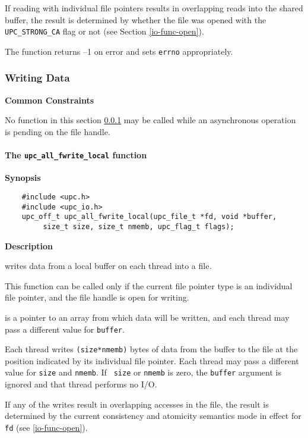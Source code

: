\np If reading with individual file pointers results in overlapping reads into the
shared buffer, the result is determined by whether the file was opened with
the {\tt UPC\_STRONG\_CA} flag or not (see Section \ref{io-func-open}).

\np The function returns --1 on error and sets {\tt errno} appropriately.

\subsubsection{Writing Data}
\label{io-func-write}
{\bf Common Constraints}

\npf No function in this section \ref{io-func-write} may be called while an asynchronous
operation is pending on the file handle.

\paragraph{The {\tt upc\_all\_fwrite\_local} function}

{\bf Synopsis}

\npf\vspace{-2.5em}
\begin{verbatim}
    #include <upc.h>
    #include <upc_io.h>
    upc_off_t upc_all_fwrite_local(upc_file_t *fd, void *buffer,
         size_t size, size_t nmemb, upc_flag_t flags);
\end{verbatim}

{\bf Description}

 writes data from a local buffer on each thread
into a file\textit{.}

\np This function can be called only if the current file pointer type is an
individual file pointer, and the file handle is open for writing. 

 is a pointer to an array from which data will be written, and each
thread may pass a different value for {\tt buffer}.

\np Each thread writes {\tt (size*nmemb)} bytes of data from the
buffer to the file at the position indicated by its individual file pointer.
Each thread may pass a different value for {\tt size} and {\tt nmemb}. If {\tt
size} or {\tt nmemb} is zero, the {\tt buffer} argument is ignored and that
thread performs no I/O. 

\np If any of the writes result in overlapping accesses in the file, the
result is determined by the current consistency and atomicity semantics mode in
effect for {\tt fd} (see \ref{io-func-open}).

